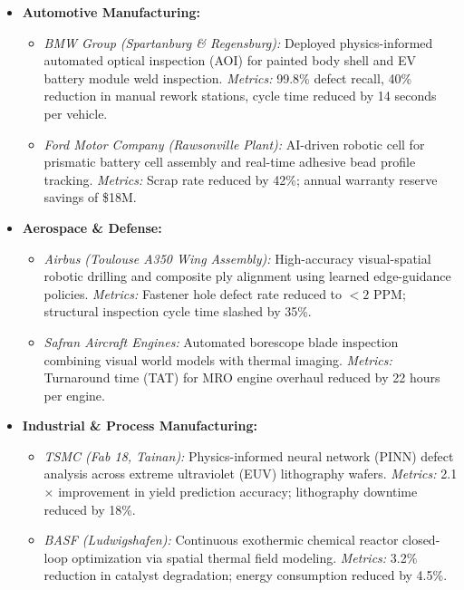\documentclass[11pt,a4paper]{article}
\begin{document}
\begin{itemize}
    \item \textbf{Automotive Manufacturing:}
    \begin{itemize}
        \item \textit{BMW Group (Spartanburg \& Regensburg):} Deployed physics-informed automated optical inspection (AOI) for painted body shell and EV battery module weld inspection. \textit{Metrics:} 99.8\% defect recall, 40\% reduction in manual rework stations, cycle time reduced by 14 seconds per vehicle.
        \item \textit{Ford Motor Company (Rawsonville Plant):} AI-driven robotic cell for prismatic battery cell assembly and real-time adhesive bead profile tracking. \textit{Metrics:} Scrap rate reduced by 42\%; annual warranty reserve savings of \$18M.
    \end{itemize}

    \item \textbf{Aerospace \& Defense:}
    \begin{itemize}
        \item \textit{Airbus (Toulouse A350 Wing Assembly):} High-accuracy visual-spatial robotic drilling and composite ply alignment using learned edge-guidance policies. \textit{Metrics:} Fastener hole defect rate reduced to $<2\text{ PPM}$; structural inspection cycle time slashed by 35\%.
        \item \textit{Safran Aircraft Engines:} Automated borescope blade inspection combining visual world models with thermal imaging. \textit{Metrics:} Turnaround time (TAT) for MRO engine overhaul reduced by 22 hours per engine.
    \end{itemize}

    \item \textbf{Industrial \& Process Manufacturing:}
    \begin{itemize}
        \item \textit{TSMC (Fab 18, Tainan):} Physics-informed neural network (PINN) defect analysis across extreme ultraviolet (EUV) lithography wafers. \textit{Metrics:} 2.1$\times$ improvement in yield prediction accuracy; lithography downtime reduced by 18\%.
        \item \textit{BASF (Ludwigshafen):} Continuous exothermic chemical reactor closed-loop optimization via spatial thermal field modeling. \textit{Metrics:} 3.2\% reduction in catalyst degradation; energy consumption reduced by 4.5\%.
    \end{itemize}


\end{itemize}
\end{document}
